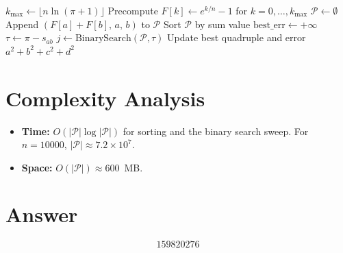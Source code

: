 \documentclass[11pt]{article}
\begin{document}
\begin{algorithm}[H]
\caption{Meet-in-the-Middle for Almost Pi}
\begin{algorithmic}[1]
\State $k_{\max} \gets \lfloor n \ln(\pi + 1) \rfloor$
\State Precompute $F[k] \gets e^{k/n} - 1$ for $k = 0, \ldots, k_{\max}$
\State $\mathcal{P} \gets \emptyset$
    \State Append $(F[a] + F[b],\, a,\, b)$ to $\mathcal{P}$
\EndFor
\State Sort $\mathcal{P}$ by sum value
\State $\text{best\_err} \gets +\infty$
    \State $\tau \gets \pi - s_{ab}$
    \State $j \gets \text{BinarySearch}(\mathcal{P}, \tau)$
            \State Update best quadruple and error
        \EndIf
    \EndFor
\EndFor
\State \Return $a^2 + b^2 + c^2 + d^2$
\end{algorithmic}
\end{algorithm}

\section{Complexity Analysis}

\begin{itemize}
    \item \textbf{Time:} $O(|\mathcal{P}| \log |\mathcal{P}|)$ for sorting and the binary search sweep. For $n = 10000$, $|\mathcal{P}| \approx 7.2 \times 10^7$.
    \item \textbf{Space:} $O(|\mathcal{P}|) \approx 600$~MB.
\end{itemize}

\section{Answer}

\[
\boxed{159820276}
\]
\end{document}
